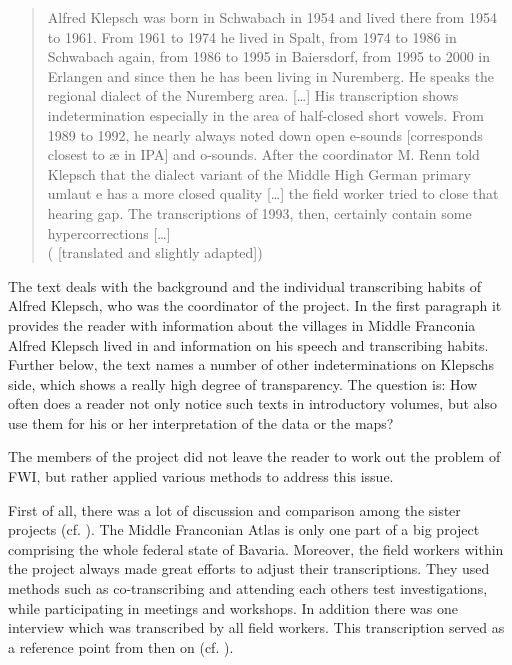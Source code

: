 \documentclass[output=paper]{LSP/langsci}
\begin{document}
\begin{quote}
Alfred Klepsch was born in Schwabach in 1954 and lived there from 1954 to 1961. From 1961 to 1974 he lived in Spalt, from 1974 to 1986 in Schwabach again, from 1986 to 1995 in Baiersdorf, from 1995 to 2000 in Erlangen and since then he has been living in Nuremberg. He speaks the regional dialect of the Nuremberg area. […] His transcription shows indetermination especially in the area of half-closed short vowels. From 1989 to 1992, he nearly always noted down open e-sounds [corresponds closest to æ in IPA] and o-sounds. After the coordinator M. Renn told Klepsch that the dialect variant of the Middle High German primary umlaut e has a more closed quality […] the field worker tried to close that {\textquotedbl}hearing gap{\textquotedbl}. The transcriptions of 1993, then, certainly contain some hypercorrections […]\\(\citealt[47]{klepsch_sprachatlas_2013} [translated and slightly adapted])
\end{quote}

The text deals with the background and the individual transcribing habits of Alfred Klepsch, who was the coordinator of the project. In the first paragraph it provides the reader with information about the villages in Middle Franconia Alfred Klepsch lived in and information on his speech and transcribing habits. Further below, the text names a number of other indeterminations on Klepsch{\textquotesingle}s side, which shows a really high degree of transparency. The question is: How often does a reader not only notice such texts in introductory volumes, but also use them for his or her interpretation of the data or the maps?

The members of the project did not leave the reader to work out the problem of FWI, but rather applied various methods to address this issue.

First of all, there was a lot of discussion and comparison among the sister projects (cf. \citealt[25 ff.]{klepsch_wie_2013}). The Middle Franconian Atlas is only one part of a big project comprising the whole federal state of Bavaria. Moreover, the field workers within the project always made great efforts to adjust their transcriptions. They used methods such as co-transcribing and attending each other{\textquotesingle}s test investigations, while participating in meetings and workshops. In addition there was one interview which was transcribed by all field workers. This transcription served as a reference point from then on (cf. \citealt[26]{klepsch_wie_2013}).
\end{document}
